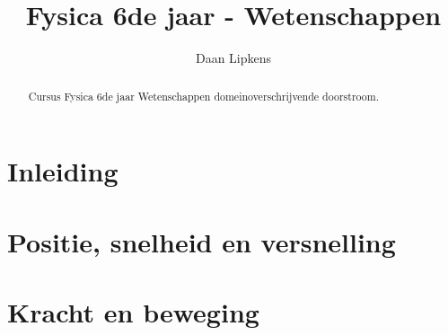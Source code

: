 \documentclass[nonewpage]{xourse}
\title{Fysica 6de jaar - Wetenschappen}
\author{Daan Lipkens}
\begin{document}
\begin{abstract}
    Cursus Fysica 6de jaar Wetenschappen domeinoverschrijvende doorstroom.
\end{abstract}
\maketitle




 \inleidingstart %
 \part{Inleiding}
 \inleidingstop


\part{Positie, snelheid en versnelling}

\part{Kracht en beweging} %


\end{document}
